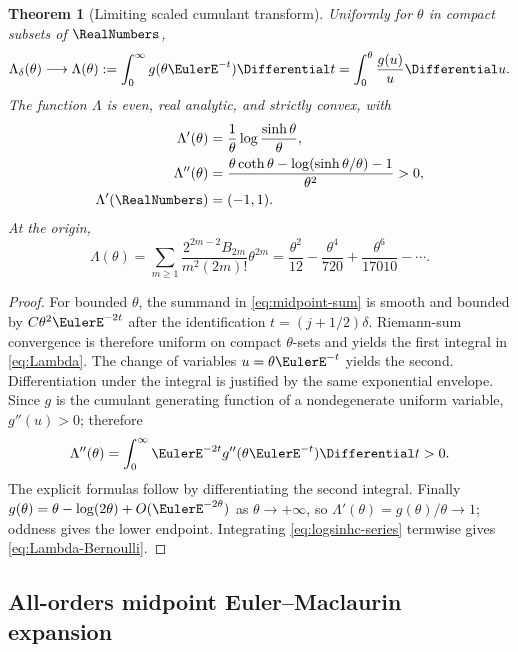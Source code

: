 \documentclass[11pt,a4paper]{article}
\newtheorem{theorem}{Theorem}[section]
\theoremstyle{definition}
\begin{document}
\begin{theorem}[Limiting scaled cumulant transform]
\label{thm:lambda-limit}
Uniformly for $\theta$ in compact subsets of $\RealNumbers$,
\begin{equation}
 \Lambda_\delta(\theta)\longrightarrow
 \Lambda(\theta):=\int_0^\infty g(\theta \EulerE^{-t})\Differential t
 =\int_0^\theta\frac{g(u)}{u}\Differential u.
 \label{eq:Lambda}
\end{equation}
The function $\Lambda$ is even, real analytic, and strictly convex, with
\begin{align}
 \Lambda'(\theta)&=\frac{1}{\theta}
    \log\frac{\sinh\theta}{\theta},
 \label{eq:Lambda-prime}\\
 \Lambda''(\theta)&=
 \frac{\theta\coth\theta-
       \log(\sinh\theta/\theta)-1}{\theta^2}>0,
 \label{eq:Lambda-second}\\
 \Lambda'(\RealNumbers)&=(-1,1).
 \label{eq:gradient-range}
\end{align}
At the origin,
\begin{equation}
 \Lambda(\theta)=
 \sum_{m\ge1}
 \frac{2^{2m-2}B_{2m}}{m^2(2m)!}\theta^{2m}
 =\frac{\theta^2}{12}-\frac{\theta^4}{720}
  +\frac{\theta^6}{17010}-\cdots.
 \label{eq:Lambda-Bernoulli}
\end{equation}
\end{theorem}

\begin{proof}
For bounded $\theta$, the summand in \eqref{eq:midpoint-sum} is smooth and
bounded by $C\theta^2\EulerE^{-2t}$ after the identification
$t=(j+1/2)\delta$.  Riemann-sum convergence is therefore uniform on compact
$\theta$-sets and yields the first integral in \eqref{eq:Lambda}.  The change
of variables $u=\theta \EulerE^{-t}$ yields the second.  Differentiation under the
integral is justified by the same exponential envelope.  Since
$g$ is the cumulant generating function of a nondegenerate uniform variable,
$g''(u)>0$; therefore
\[
 \Lambda''(\theta)=\int_0^\infty \EulerE^{-2t}g''(\theta \EulerE^{-t})\Differential t>0.
\]
The explicit formulas follow by differentiating the second integral.  Finally
$g(\theta)=\theta-\log(2\theta)+O(\EulerE^{-2\theta})$ as
$\theta\to+\infty$, so $\Lambda'(\theta)=g(\theta)/\theta\to1$;
oddness gives the lower endpoint.  Integrating \eqref{eq:logsinhc-series}
termwise gives \eqref{eq:Lambda-Bernoulli}.
\end{proof}

\subsection{All-orders midpoint Euler--Maclaurin expansion}
\end{document}
